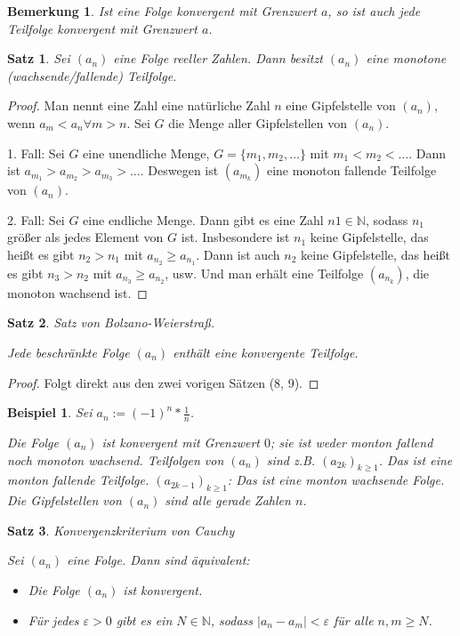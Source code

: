 \documentclass[a4paper,10pt]{article}
\newtheorem*{notice}{Bemerkung}
\newtheorem*{example}{Beispiel}
\newtheorem*{satz}{Satz}
\begin{document}
\begin{notice}
 Ist eine Folge konvergent mit Grenzwert $a$, so ist auch jede Teilfolge konvergent mit Grenzwert $a$.
\end{notice}

\begin{satz}
 Sei $(a_n)$ eine Folge reeller Zahlen.
 Dann besitzt  $(a_n)$ eine monotone (wachsende/fallende) Teilfolge.
\end{satz}

\begin{proof}
 Man nennt eine Zahl eine natürliche Zahl $n$ eine Gipfelstelle von $(a_n)$, wenn $a_m < a_n \forall m > n$.
 Sei $G$ die Menge aller Gipfelstellen von $(a_n)$.
 
 1. Fall: Sei $G$ eine unendliche Menge, $G = \{m_1, m_2, \dots\}$ mit $m_1 < m_2 < \dots$.
 Dann ist $a_{m_1} > a_{m_2} > a_{m_3} > \dots$.
 Deswegen ist $(a_{m_k})$ eine monoton fallende Teilfolge von $(a_n)$.
 
 2. Fall: Sei $G$ eine endliche Menge.
 Dann gibt es eine Zahl $n1 \in \mathbb{N}$, sodass $n_1$ größer als jedes Element von $G$ ist.
 Insbesondere ist $n_1$ keine Gipfelstelle, das heißt es gibt $n_2 > n_1$ mit $a_{n_2} \ge a_{n_1}$.
 Dann ist auch $n_2$ keine Gipfelstelle, das heißt es gibt $n_3 > n_2$ mit $a_{n_3} \ge a_{n_2}$, usw.
 Und man erhält eine Teilfolge $(a_{n_k})$, die monoton wachsend ist.
\end{proof}

\begin{satz}
 Satz von Bolzano-Weierstraß.
 
 Jede beschränkte Folge $(a_n)$ enthält eine konvergente Teilfolge.
\end{satz}

\begin{proof}
 Folgt direkt aus den zwei vorigen Sätzen (8, 9).
\end{proof}

\begin{example}
 Sei $a_n := (-1)^n * \frac{1}{n}$.
 
 Die Folge $(a_n)$ ist konvergent mit Grenzwert $0$; sie ist weder monton fallend noch monoton wachsend.
 Teilfolgen von $(a_n)$ sind z.B. $(a_{2k})_{k \ge 1}$.
 Das ist eine monton fallende Teilfolge.
 $(a_{2k - 1})_{k \ge 1}$: Das ist eine monton wachsende Folge.
 Die Gipfelstellen von $(a_n)$ sind alle gerade Zahlen $n$.
\end{example}

\begin{satz}
 Konvergenzkriterium von Cauchy
 
 Sei $(a_n)$ eine Folge.
 Dann sind äquivalent:
 \begin{itemize}
  \item Die Folge $(a_n)$ ist konvergent.
  \item Für jedes $\varepsilon > 0$ gibt es ein $N \in \mathbb{N}$, sodass $|a_n - a_m| < \varepsilon$ für alle $n, m \ge N$.
 \end{itemize}
\end{satz}
\end{document}
